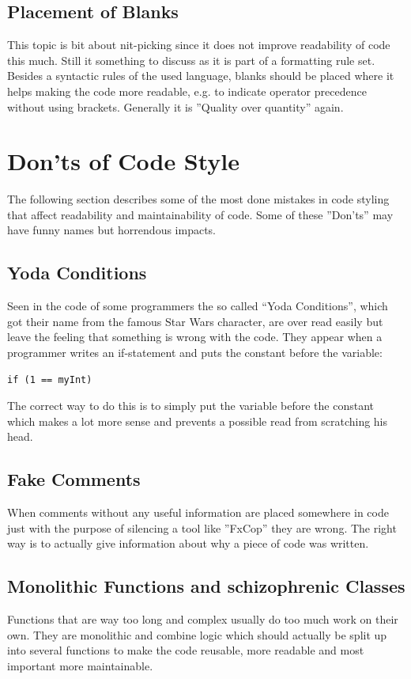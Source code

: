 \subsection{Placement of Blanks}
This topic is bit about nit-picking since it does not improve readability of code this much. Still it something to discuss as it is part of a formatting rule set. Besides a syntactic rules of the used language, blanks should be placed where it helps making the code more readable, e.g. to indicate operator precedence without using brackets. Generally it is ''Quality over quantity'' again.

\section{Don’ts of Code Style}
The following section describes some of the most done mistakes in code styling that affect readability and maintainability of code. Some of these ''Don'ts'' may have funny names but horrendous impacts.

\subsection{Yoda Conditions}
Seen in the code of some programmers the so called “Yoda Conditions”, which got their name from the famous Star Wars character, are over read easily but leave the feeling that something is wrong with the code. They appear when a programmer writes an if-statement and puts the constant before the variable:
\begin{lstlisting}[label={list:first}]
if (1 == myInt)
\end{lstlisting}
The correct way to do this is to simply put the variable before the constant which makes a lot more sense and prevents a possible read from scratching his head.

\subsection{Fake Comments}
When comments without any useful information are placed somewhere in code just with the purpose of silencing a tool like ''FxCop'' they are wrong. The right way is to actually give information about why a piece of code was written.

\subsection{Monolithic Functions and schizophrenic Classes}
Functions that are way too long and complex usually do too much work on their own. They are monolithic and combine logic which should actually be split up into several functions to make the code reusable, more readable and most important more maintainable.

